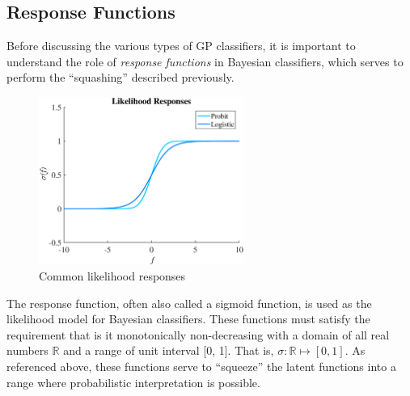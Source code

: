 		\subsection{Response Functions}
		\label{BenthicHabitatMapping:Classification:ResponseFunction}
		
			Before discussing the various types of GP classifiers, it is important to understand the role of \textit{response functions} in Bayesian classifiers, which serves to perform the ``squashing'' described previously.

			\begin{figure}[!htbp]
				\centering
					\includegraphics[width=0.6\textwidth]{Figures/responses.eps}
				\caption{Common likelihood responses}
				\label{Figure:LikelihoodResponses}
			\end{figure}
					
			The response function, often also called a sigmoid function, is used as the likelihood model for Bayesian classifiers. These functions must satisfy the requirement that is it monotonically non-decreasing with a domain of all real numbers $\mathbb{R}$ and a range of unit interval [0, 1]. That is, $\sigma: \mathbb{R} \mapsto [0, 1]$. As referenced above, these functions serve to ``squeeze'' the latent functions into a range where probabilistic interpretation is possible.
				
